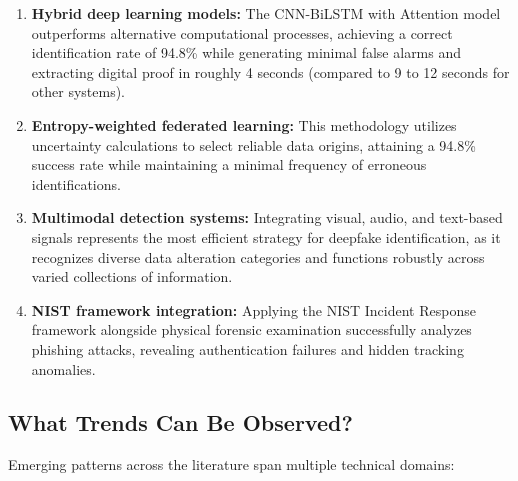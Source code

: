 \documentclass[12pt,a4paper]{article}
\begin{document}
\begin{enumerate}
    \item \textbf{Hybrid deep learning models:} The CNN-BiLSTM with Attention model outperforms alternative computational processes, achieving a correct identification rate of 94.8\% while generating minimal false alarms and extracting digital proof in roughly 4 seconds (compared to 9 to 12 seconds for other systems).
    \item \textbf{Entropy-weighted federated learning:} This methodology utilizes uncertainty calculations to select reliable data origins, attaining a 94.8\% success rate while maintaining a minimal frequency of erroneous identifications.
    \item \textbf{Multimodal detection systems:} Integrating visual, audio, and text-based signals represents the most efficient strategy for deepfake identification, as it recognizes diverse data alteration categories and functions robustly across varied collections of information.
    \item \textbf{NIST framework integration:} Applying the NIST Incident Response framework alongside physical forensic examination successfully analyzes phishing attacks, revealing authentication failures and hidden tracking anomalies.
\end{enumerate}

\newpage
\subsection{What Trends Can Be Observed?}

Emerging patterns across the literature span multiple technical domains:
\end{document}
